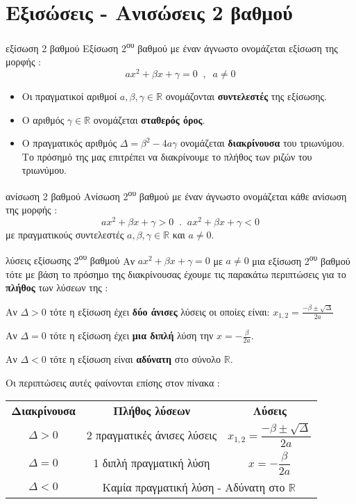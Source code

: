 \section{Εξισώσεις - Ανισώσεις 2 βαθμού}
\orismoi
\begin{orismos}{εξίσωση 2 βαθμού}
Εξίσωση 2\textsuperscript{ου} βαθμού με έναν άγνωστο ονομάζεται εξίσωση της μορφής :
\[ ax^2+\beta x+\gamma=0\;\;,\;\;a\neq0 \]
\end{orismos} 
\begin{itemize}[itemsep=0mm]
\item Οι πραγματικοί αριθμοί $ a,\beta,\gamma\in\mathbb{R} $ ονομάζονται \textbf{συντελεστές} της εξίσωσης.
\item Ο αριθμός $ \gamma\in\mathbb{R} $ ονομάζεται \textbf{σταθερός όρος}.
\item O πραγματικός αριθμός $ \varDelta=\beta^2-4a\gamma $ ονομάζεται \textbf{διακρίνουσα} του τριωνύμου. Το πρόσημό της μας επιτρέπει να διακρίνουμε το πλήθος των ριζών του τριωνύμου.
\end{itemize}
\begin{orismos}{ανίσωση 2 βαθμού}
Ανίσωση 2\textsuperscript{ου} βαθμού με έναν άγνωστο ονομάζεται κάθε ανίσωση της μορφής :
\[ ax^2+\beta x+\gamma>0\;\;.\;\;ax^2+\beta x+\gamma<0 \]
με πραγματικούς συντελεστές $ a,\beta,\gamma\in\mathbb{R} $ και $ a\neq0 $.
\end{orismos}
\thewrhmata
\begin{thewrhma}{λύσεις εξίσωσης 2\textsuperscript{\MakeLowercase{ου}} βαθμού}
Αν $ ax^2+\beta x+\gamma=0 $ με $ a\neq0 $ μια εξίσωση 2\textsuperscript{ου} βαθμού τότε με βάση το πρόσημο της διακρίνουσας έχουμε τις παρακάτω περιπτώσεις για το \textbf{πλήθος} των λύσεων της :
\begin{rlist}
\item Αν $ \varDelta>0 $ τότε η εξίσωση έχει \textbf{δύο άνισες} λύσεις οι οποίες είναι: $ x_{1,2}=\frac{-\beta\pm\!\sqrt{\varDelta}}{2a} $
\item Αν $ \varDelta=0 $ τότε η εξίσωση έχει \textbf{μια διπλή} λύση την $ x=-\frac{\beta}{2a} $.
\item Αν $ \varDelta<0 $ τότε η εξίσωση είναι \textbf{αδύνατη} στο σύνολο $ \mathbb{R} $.
\end{rlist}
\end{thewrhma}
Οι περιπτώσεις αυτές φαίνονται επίσης στον πίνακα :
\begin{center}
\begin{tabular}{ccc}
\hline\textbf{Διακρίνουσα} & \textbf{Πλήθος λύσεων} & \textbf{Λύσεις} \rule[-2ex]{0pt}{5.5ex}\\ 
\hhline{===}\rule[-2ex]{0pt}{7ex} $ \varDelta>0 $ &  2 πραγματικές άνισες λύσεις & $ x_{1,2}=\dfrac{-\beta\pm\!\sqrt{\varDelta}}{2a} $  \\
\rule[-2ex]{0pt}{6.5ex} $ \varDelta=0 $ & 1 διπλή πραγματική λύση & $ x=-\dfrac{\beta}{2a} $\\
\rule[-2ex]{0pt}{6.5ex} $ \varDelta<0 $ & \multicolumn{2}{c}{Καμία πραγματική λύση - Αδύνατη στο $ \mathbb{R} $}\\
\hline 
\end{tabular}
\end{center}
